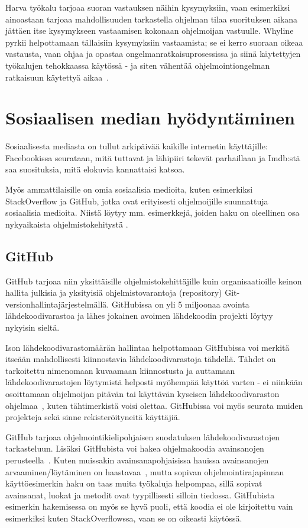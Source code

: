 \documentclass[finnish]{tktltiki2}
\theoremstyle{definition}
\theoremstyle{remark}
\begin{document}
Harva työkalu tarjoaa suoran vastauksen näihin kysymyksiin, vaan esimerkiksi ainoastaan tarjoaa mahdollisuuden tarkastella ohjelman tilaa suorituksen aikana jättäen itse kysymykseen vastaamisen kokonaan ohjelmoijan vastuulle.
Whyline pyrkii helpottamaan tällaisiin kysymyksiin vastaamista; se ei kerro suoraan oikeaa vastausta, vaan ohjaa ja opastaa ongelmanratkaisuprosessissa ja siinä käytettyjen työkalujen tehokkaassa käytössä - ja siten vähentää ohjelmointiongelman ratkaisuun käytettyä aikaa~\cite{whyline}.

\section{Sosiaalisen median hyödyntäminen}
Sosiaalisesta mediasta on tullut arkipäivää kaikille internetin käyttäjille:  Facebookissa seurataan, mitä tuttavat ja lähipiiri tekevät parhaillaan ja Imdb:stä saa  suosituksia, mitä elokuvia kannattaisi katsoa. 

Myös ammattilaisille on omia sosiaalisia medioita, kuten esimerkiksi StackOverflow ja GitHub, jotka ovat erityisesti ohjelmoijille suunnattuja sosiaalisia medioita. Niistä löytyy mm. esimerkkejä, joiden haku on oleellinen osa nykyaikaista ohjelmistokehitystä \cite{example-overflow-social-media-for-code-recommendations}.

\subsection{GitHub}
GitHub tarjoaa niin yksittäisille ohjelmistokehittäjille kuin organisaatioille keinon hallita julkisia ja yksityisiä ohjelmistovarantoja (repository) Git-versionhallintajärjestelmällä. GitHubissa on yli 5 miljoonaa avointa lähdekoodivarastoa ja lähes jokainen avoimen lähdekoodin projekti löytyy nykyisin sieltä.

Ison lähdekoodivarastomäärän hallintaa helpottamaan GitHubissa voi merkitä itseään mahdollisesti kiinnostavia lähdekoodivarastoja tähdellä. Tähdet on tarkoitettu nimenomaan kuvaamaan kiinnostusta ja auttamaan lähdekoodivarastojen löytymistä helposti myöhempää käyttöä varten - ei niinkään osoittamaan ohjelmoijan pitävän tai käyttävän kyseisen lähdekoodivaraston ohjelmaa~\cite{social-networking-meets-se}, kuten tähtimerkistä voisi olettaa. GitHubissa voi myös seurata muiden projekteja sekä sinne rekisteröityneitä käyttäjiä.

GitHub tarjoaa ohjelmointikielipohjaisen suodatuksen lähdekoodivarastojen tarkasteluun. Lisäksi GitHubista voi hakea ohjelmakoodia avainsanojen perusteella~\cite{social-networking-meets-se}. Kuten muissakin avainsanapohjaisissa hauissa avainsanojen arvaaminen/löytäminen on haastavaa~\cite{what-to-search-for}, mutta sopivan ohjelmointirajapinnan käyttöesimerkin haku on taas muita työkaluja helpompaa, sillä sopivat avainsanat, luokat ja metodit ovat tyypillisesti silloin tiedossa. GitHubista esimerkin hakemisessa on myös se hyvä puoli, että koodia ei ole kirjoitettu vain esimerkiksi kuten StackOverflowssa, vaan se on oikeasti käytössä.
\end{document}
